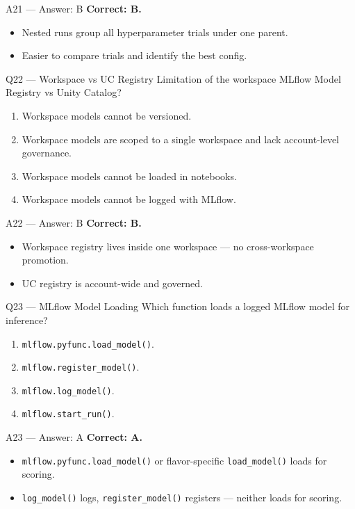 \documentclass[aspectratio=169,10pt]{beamer}
\begin{document}
	\begin{frame}{A21 — Answer: B}
		\textbf{Correct: B.}
		\begin{itemize}
			\item Nested runs group all hyperparameter trials under one parent.
			\item Easier to compare trials and identify the best config.
		\end{itemize}
	\end{frame}
	
	\begin{frame}{Q22 — Workspace vs UC Registry}
		Limitation of the workspace MLflow Model Registry vs Unity Catalog?
		\begin{enumerate}[label=\Alph*.]
			\item Workspace models cannot be versioned.
			\item Workspace models are scoped to a single workspace and lack account-level governance.
			\item Workspace models cannot be loaded in notebooks.
			\item Workspace models cannot be logged with MLflow.
		\end{enumerate}
	\end{frame}
	
	\begin{frame}{A22 — Answer: B}
		\textbf{Correct: B.}
		\begin{itemize}
			\item Workspace registry lives inside one workspace — no cross-workspace promotion.
			\item UC registry is account-wide and governed.
		\end{itemize}
	\end{frame}
	
	\begin{frame}{Q23 — MLflow Model Loading}
		Which function loads a logged MLflow model for inference?
		\begin{enumerate}[label=\Alph*.]
			\item \texttt{mlflow.pyfunc.load\_model()}.
			\item \texttt{mlflow.register\_model()}.
			\item \texttt{mlflow.log\_model()}.
			\item \texttt{mlflow.start\_run()}.
		\end{enumerate}
	\end{frame}
	
	\begin{frame}{A23 — Answer: A}
		\textbf{Correct: A.}
		\begin{itemize}
			\item \texttt{mlflow.pyfunc.load\_model()} or flavor-specific \texttt{load\_model()} loads for scoring.
			\item \texttt{log\_model()} logs, \texttt{register\_model()} registers — neither loads for scoring.
		\end{itemize}
	\end{frame}
	
\end{document}
